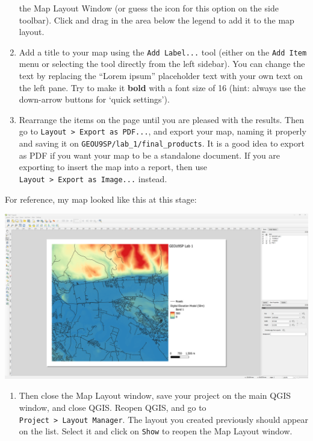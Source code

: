 \documentclass[
  letterpaper,
  DIV=11,
  numbers=noendperiod]{scrreprt}
\providecommand{\tightlist}{%
  \setlength{\itemsep}{0pt}\setlength{\parskip}{0pt}}\usepackage{longtable,booktabs,array}
\begin{document}
\begin{enumerate}
  the Map Layout Window (or guess the icon for this option on the side
  toolbar). Click and drag in the area below the legend to add it to the
  map layout.
\item
  Add a title to your map using the \texttt{Add\ Label...} tool (either
  on the \texttt{Add\ Item} menu or selecting the tool directly from the
  left sidebar). You can change the text by replacing the ``Lorem
  ipsum'' placeholder text with your own text on the left pane. Try to
  make it \textbf{bold} with a font size of 16 (hint: always use the
  down-arrow buttons for `quick settings').
\item
  Rearrange the items on the page until you are pleased with the
  results. Then go to
  \texttt{Layout\ \textgreater{}\ Export\ as\ PDF...}, and export your
  map, naming it properly and saving it on
  \texttt{GEOU9SP/lab\_1/final\_products}. It is a good idea to export
  as PDF if you want your map to be a standalone document. If you are
  exporting to insert the map into a report, then use
  \texttt{Layout\ \textgreater{}\ Export\ as\ Image...} instead.
\end{enumerate}

For reference, my map looked like this at this stage:

\includegraphics{images/lab_1/lab1_fig6_mapzoom.png}

\begin{enumerate}
\def\labelenumi{(\arabic{enumi})}
\setcounter{enumi}{43}
\tightlist
\item
  Then close the Map Layout window, save your project on the main QGIS
  window, and close QGIS. Reopen QGIS, and go to
  \texttt{Project\ \textgreater{}\ Layout\ Manager}. The layout you
  created previously should appear on the list. Select it and click on
  \texttt{Show} to reopen the Map Layout window.
\end{enumerate}
\end{document}
